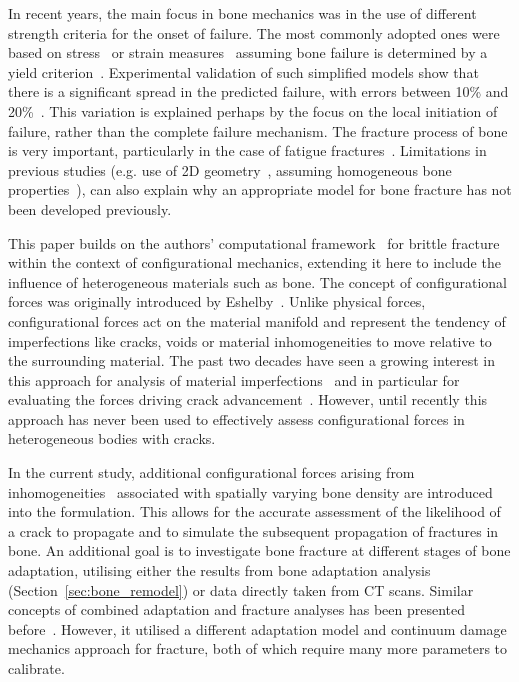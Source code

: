 \documentclass[review]{elsarticle}
\numberwithin{equation}{section}
\begin{document}
In recent years, the main focus in bone mechanics was in the use of different strength criteria for the onset of failure. 
The most commonly adopted ones were based on stress~\citep{keyak2005predicting} or strain measures~\citep{schileo2008subject} assuming bone failure is determined by a yield criterion~\citep{yosibash2010predicting}. 
Experimental validation of such simplified models show that there is a significant spread in the predicted failure, with errors between 10\% and 20\%~\citep{van2014accurately}.
This variation is explained perhaps by the focus on the local initiation of failure, rather than the complete failure mechanism. 
The fracture process of bone is very important,  particularly in the case of fatigue fractures~\citep{gupta2008fracture}. 
Limitations in previous studies (e.g. use of 2D geometry~\citep{bettamer2017using}, assuming homogeneous bone properties~\citep{gasser2007numerical}), 
can also explain why an appropriate model for bone fracture has not been developed previously.

This paper builds on the authors' computational framework~\citep{kaczmarczyk2017energy} for brittle fracture within the context of configurational mechanics, extending it here to include the influence of heterogeneous materials such as bone.
The concept of configurational forces was originally introduced by Eshelby~\citep{eshelby1951force}. 
Unlike physical forces, configurational forces act on the material manifold and represent the tendency of imperfections like cracks, voids or material inhomogeneities to move relative to the surrounding material. 
The past two decades have seen a growing interest in this approach for analysis of material imperfections~\citep{maugin2016configurational} and in particular for evaluating the forces driving crack advancement~\citep{kaczmarczyk2017energy,steinmann2001application, ozencc2016configurational}. 
However, until recently this approach has never been used to effectively assess configurational forces in heterogeneous bodies with cracks. 

In the current study, additional configurational forces arising from inhomogeneities~\citep{kienzler2014configurational}
associated with spatially varying bone density are introduced into the formulation. This allows for the accurate assessment of the likelihood of a crack to propagate and to simulate  the subsequent propagation of fractures in bone. 
An additional goal is to investigate bone fracture at different stages of bone adaptation, utilising either the results from bone adaptation analysis (Section~\ref{sec:bone_remodel}) or data directly taken from CT scans. 
Similar concepts of combined adaptation and fracture analyses has been presented before~\citep{hambli2013integrated}. 
However, it utilised a different adaptation model and continuum damage mechanics approach for fracture, both of which require many more parameters to calibrate. 
\end{document}
